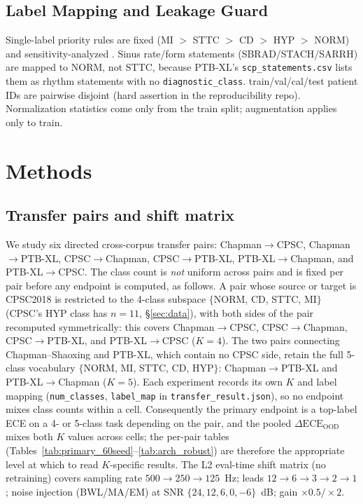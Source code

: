 \documentclass[review,12pt,nonatbib]{elsarticle}
\begin{document}
\subsection{Label Mapping and Leakage Guard}
Single-label priority rules are fixed (MI $>$ STTC $>$ CD $>$ HYP $>$ NORM)
and sensitivity-analyzed \cite{wagner2020ptbxl,reyna2022}. Sinus rate/form
statements (SBRAD/STACH/SARRH) are mapped to NORM, not STTC, because
PTB-XL's \texttt{scp\_statements.csv} lists them as rhythm statements
with no \texttt{diagnostic\_class}. train\slash val\slash cal\slash test patient IDs are
pairwise disjoint (hard assertion in the reproducibility repo).
Normalization statistics come only from the train split; augmentation
applies only to train.

\section{Methods}
\label{sec:methods}
\subsection{Transfer pairs and shift matrix}
\label{sec:shiftmatrix}
We study six directed cross-corpus transfer pairs:
Chapman$\rightarrow$CPSC, Chapman$\rightarrow$PTB-XL,
CPSC$\rightarrow$Chapman, CPSC$\rightarrow$PTB-XL,
PTB-XL$\rightarrow$Chapman, and PTB-XL$\rightarrow$CPSC. The class
count is \emph{not} uniform across pairs and is fixed per pair before
any endpoint is computed, as follows. A pair whose source or target is
CPSC2018 is restricted to the 4-class subspace
$\{$NORM, CD, STTC, MI$\}$ (CPSC's HYP class has $n=11$,
\S\ref{sec:data}), with both sides of the pair recomputed symmetrically:
this covers Chapman$\rightarrow$CPSC, CPSC$\rightarrow$Chapman,
CPSC$\rightarrow$PTB-XL, and PTB-XL$\rightarrow$CPSC ($K=4$). The two
pairs connecting Chapman--Shaoxing and PTB-XL, which contain no CPSC
side, retain the full 5-class vocabulary
$\{$NORM, MI, STTC, CD, HYP$\}$: Chapman$\rightarrow$PTB-XL and
PTB-XL$\rightarrow$Chapman ($K=5$). Each experiment records its own
$K$ and label mapping (\texttt{num\_classes}, \texttt{label\_map} in
\texttt{transfer\_result.json}), so no endpoint mixes class counts
within a cell. Consequently the primary endpoint is a top-label ECE on
a 4- or 5-class task depending on the pair, and the pooled
$\Delta\text{ECE}_{\text{OOD}}$ mixes both $K$ values across cells; the
per-pair tables (Tables~\ref{tab:primary_60seed}--\ref{tab:arch_robust})
are therefore the appropriate level at which to read $K$-specific
results. The L2 eval-time shift matrix (no retraining)
covers sampling rate $500\rightarrow250\rightarrow125$~Hz; leads
$12\rightarrow6\rightarrow3\rightarrow2\rightarrow1$; noise injection
(BWL/MA/EM) at SNR $\{24,12,6,0,-6\}$~dB; gain $\times0.5/\times2$.
\end{document}
